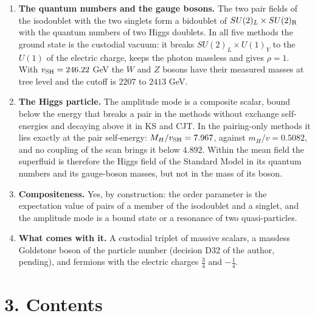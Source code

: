 \documentclass[
  10pt,
]{article}
\providecommand{\tightlist}{%
  \setlength{\itemsep}{0pt}\setlength{\parskip}{0pt}}
\begin{document}
\begin{enumerate}
\def\labelenumi{\arabic{enumi}.}
\tightlist
\item
  \textbf{The quantum numbers and the gauge bosons.} The two pair fields
  of the isodoublet with the two singlets form a bidoublet of
  \(SU(2)_L\times SU(2)_{\rm R}\) with the quantum numbers of two Higgs
  doublets. In all five methods the ground state is the custodial
  vacuum: it breaks \(SU(2)_L\times U(1)_Y\) to the \(U(1)\) of the
  electric charge, keeps the photon massless and gives \(\rho=1\). With
  \(v_{\rm SH}=246.22\) GeV the \(W\) and \(Z\) bosons have their
  measured masses at tree level and the cutoff is \(2207\) to \(2413\)
  GeV.
\item
  \textbf{The Higgs particle.} The amplitude mode is a composite scalar,
  bound below the energy that breaks a pair in the methods without
  exchange self-energies and decaying above it in KS and CJT. In the
  pairing-only methods it lies exactly at the pair self-energy:
  \(M_H/v_{\rm SH}=7.967\), against \(m_H/v=0.5082\), and no coupling of
  the scan brings it below \(4.892\). Within the mean field the
  superfluid is therefore the Higgs field of the Standard Model in its
  quantum numbers and its gauge-boson masses, but not in the mass of its
  boson.
\item
  \textbf{Compositeness.} Yes, by construction: the order parameter is
  the expectation value of pairs of a member of the isodoublet and a
  singlet, and the amplitude mode is a bound state or a resonance of two
  quasi-particles.
\item
  \textbf{What comes with it.} A custodial triplet of massive scalars, a
  massless Goldstone boson of the particle number (decision D32 of the
  author, pending), and fermions with the electric charges \(\tfrac34\)
  and \(-\tfrac14\).
\end{enumerate}

\hypertarget{contents}{%
\section{3. Contents}\label{contents}}
\end{document}
